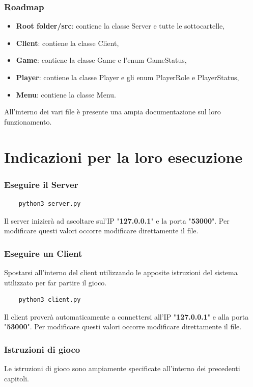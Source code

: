 \documentclass[a4paper,12pt]{report}
\begin{document}
\subsection{Roadmap}
\begin{itemize}
	\item \textbf{Root folder/src}: contiene la classe Server e tutte le sottocartelle,
	\item \textbf{Client}: contiene la classe Client,
	\item \textbf{Game}: contiene la classe Game e l'enum GameStatus,
	\item \textbf{Player}: contiene la classe Player e gli enum PlayerRole e PlayerStatus,
	\item \textbf{Menu}: contiene la classe Menu.
\end{itemize}
All'interno dei vari file è presente una ampia documentazione sul loro funzionamento.
\chapter{Indicazioni per la loro esecuzione}
\subsection{Eseguire il Server}
\begin{verbatim}
	python3 server.py
\end{verbatim}
Il server inizierà ad ascoltare sul'IP "\textbf{127.0.0.1}" e la porta "\textbf{53000}". Per modificare questi valori occorre modificare direttamente il file.
\subsection{Eseguire un Client}
Spostarsi all'interno del client utilizzando le apposite istruzioni del sistema utilizzato per far partire il gioco.
\begin{verbatim}
	python3 client.py
\end{verbatim}
Il client proverà automaticamente a connettersi all'IP "\textbf{127.0.0.1}" e alla porta "\textbf{53000}". Per modificare questi valori occorre modificare direttamente il file.
\subsection{Istruzioni di gioco}
Le istruzioni di gioco sono ampiamente specificate all'interno dei precedenti capitoli.
\end{document}
